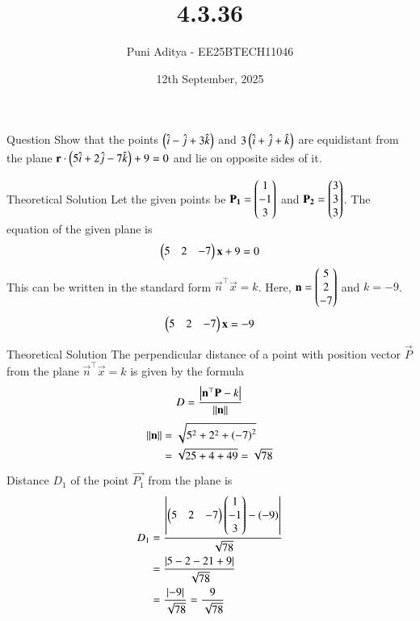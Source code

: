 \documentclass{beamer}
\title{4.3.36}
\date{12th September, 2025}
\author{Puni Aditya - EE25BTECH11046}
\begin{document}
\frame{\titlepage}
\begin{frame}{Question}
Show that the points $\left(\hat{i}-\hat{j}+3\hat{k}\right)$ and $3\left(\hat{i}+\hat{j}+\hat{k}\right)$ are equidistant from the plane $\mathbf{r}\cdot\left(5\hat{i}+2\hat{j}-7\hat{k}\right) + 9 = 0$ and lie on opposite sides of it.
\end{frame}

\begin{frame}{Theoretical Solution}
Let the given points be $\mathbf{P_1} = \begin{pmatrix}1 \\ -1 \\ 3\end{pmatrix}$ and $\mathbf{P_2} = \begin{pmatrix}3 \\ 3 \\ 3\end{pmatrix}$.
The equation of the given plane is
\begin{align}
    \begin{pmatrix}5 & 2 & -7\end{pmatrix}\mathbf{x} + 9 = 0
\end{align}
This can be written in the standard form $\vec{n}^\top\vec{x} = k$. Here, $\mathbf{n} = \begin{pmatrix}5 \\ 2 \\ -7\end{pmatrix}$ and $k = -9$.
\begin{align}
    \begin{pmatrix}5 & 2 & -7\end{pmatrix}\mathbf{x} = -9 \label{eq:plane_eqn}
\end{align}
\end{frame}

\begin{frame}{Theoretical Solution}
The perpendicular distance of a point with position vector $\vec{P}$ from the plane $\vec{n}^\top\vec{x} = k$ is given by the formula
\begin{align}
    D = \frac{\left\vert\mathbf{n}^\top\mathbf{P} - k\right\vert}{\left\lVert\mathbf{n}\right\rVert}
\end{align}
\begin{align}
    \left\lVert\mathbf{n}\right\rVert &= \sqrt{5^2 + 2^2 + \left(-7\right)^2} \\
    &= \sqrt{25 + 4 + 49} = \sqrt{78}
\end{align}
Distance $D_1$ of the point $\vec{P_1}$ from the plane is
\begin{align}
    D_1 &= \frac{\left\vert\begin{pmatrix}5 & 2 & -7\end{pmatrix}\begin{pmatrix}1 \\ -1 \\ 3\end{pmatrix} - \left(-9\right)\right\vert}{\sqrt{78}} \\
    &= \frac{\left\vert5 - 2 - 21 + 9\right\vert}{\sqrt{78}} \\
    &= \frac{\left\vert-9\right\vert}{\sqrt{78}} = \frac{9}{\sqrt{78}} \label{eq:distance1}
\end{align}
\end{frame}
\end{document}
